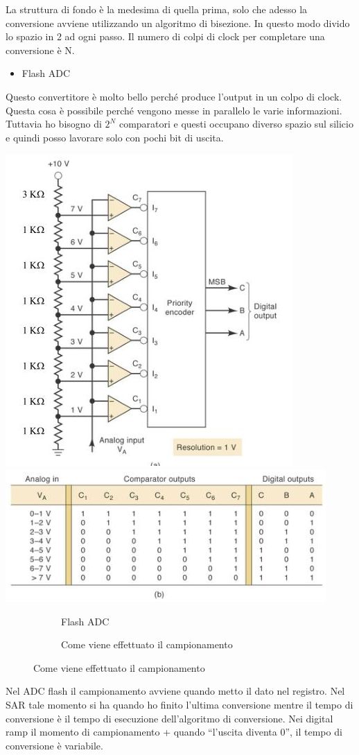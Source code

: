 \documentclass[
]{book}
\providecommand{\tightlist}{%
  \setlength{\itemsep}{0pt}\setlength{\parskip}{0pt}}
\begin{document}
La struttura di fondo è la medesima di quella prima, solo che adesso la
conversione avviene utilizzando un algoritmo di bisezione. In questo
modo divido lo spazio in 2 ad ogni passo. Il numero di colpi di clock
per completare una conversione è N.

\begin{itemize}
\tightlist
\item
  Flash ADC
\end{itemize}

Questo convertitore è molto bello perché produce l'output in un colpo di
clock. Questa cosa è possibile perché vengono messe in parallelo le
varie informazioni. Tuttavia ho bisogno di \(2^{N}\) comparatori e
questi occupano diverso spazio sul silicio e quindi posso lavorare solo
con pochi bit di uscita.

\includegraphics[width=0.4\linewidth,height=\textheight,keepaspectratio]{immagini/46.png}
\includegraphics[width=0.5\linewidth,height=\textheight,keepaspectratio]{immagini/47.png}

\begin{figure}[!h]
\begin{subfigure}[t]{0.4\textwidth}
\caption{Flash ADC}
\end{subfigure}
\hfill
\begin{subfigure}[t]{0.6\textwidth}
\caption{Come viene effettuato il campionamento}
\end{subfigure}
\end{figure}

Nel ADC flash il campionamento avviene quando metto il dato nel
registro. Nel SAR tale momento si ha quando ho finito l'ultima
conversione mentre il tempo di conversione è il tempo di esecuzione
dell'algoritmo di conversione. \newline Nei digital ramp il momento di
campionamento + quando ``l'uscita diventa 0'', il tempo di conversione è
variabile.
\end{document}
